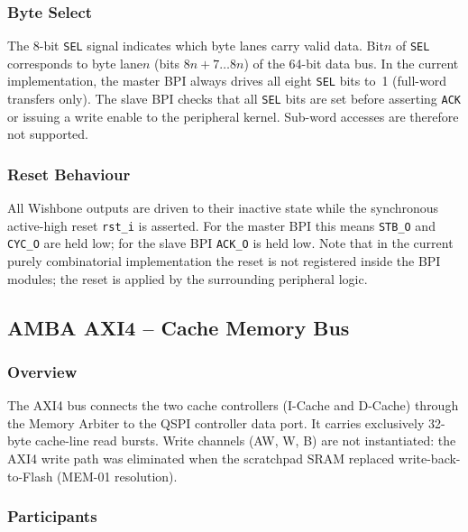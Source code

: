 \subsubsection{Byte Select}

The 8-bit \texttt{SEL} signal indicates which byte lanes carry valid data.
Bit\;$n$ of \texttt{SEL} corresponds to byte lane\;$n$ (bits $8n+7\ldots 8n$)
of the 64-bit data bus.
In the current implementation, the master BPI always drives all eight
\texttt{SEL} bits to~1 (full-word transfers only).
The slave BPI checks that all \texttt{SEL} bits are set before asserting
\texttt{ACK} or issuing a write enable to the peripheral kernel.
Sub-word accesses are therefore not supported.

\subsubsection{Reset Behaviour}

All Wishbone outputs are driven to their inactive state while the synchronous
active-high reset \texttt{rst\_i} is asserted.
For the master BPI this means \texttt{STB\_O} and \texttt{CYC\_O} are held
low; for the slave BPI \texttt{ACK\_O} is held low.
Note that in the current purely combinatorial implementation the reset
is not registered inside the BPI modules; the reset is applied by the
surrounding peripheral logic.

\subsection{AMBA AXI4 -- Cache Memory Bus}
\label{subsec:asAxi4Bus}

\subsubsection{Overview}

The AXI4 bus connects the two cache controllers (I-Cache and D-Cache)
through the Memory Arbiter to the QSPI controller data port.
It carries exclusively 32-byte cache-line read bursts.
Write channels (AW, W, B) are not instantiated: the AXI4 write path was
eliminated when the scratchpad SRAM replaced write-back-to-Flash
(MEM-01 resolution).

\subsubsection{Participants}


